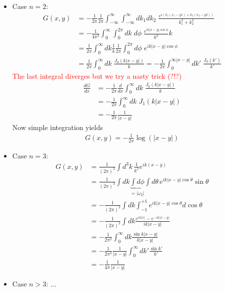 \documentclass[10pt,a4paper]{book}
\theoremstyle{definition}
\begin{document}
\begin{itemize}
\begin{center}
        \end{center}
        \item Case $n=2$:
        \begin{align}
            G(x,y)&=-\frac{1}{2\pi}\frac{1}{2\pi}\int_{-\infty}^\infty \int_{-\infty}^\infty dk_1 dk_2\; \frac{e^{i(k_1(x_1-y1)+k_2(x_2-y2))}}{k_1^2+k_2^2}\\
            &=-\frac{1}{4\pi^2}\int_{0}^\infty \int_{0}^{2\pi} dk\;d\phi\; \frac{e^{ik |x-y|\cos\phi}}{k^2}k\\
            &=\frac{1}{2\pi}\int_{0}^\infty dk \frac{1}{k}\frac{1}{2\pi}\int_{0}^{2\pi} d\phi\; e^{ik |x-y|\cos\phi}\\
            &=\frac{1}{2\pi}\int_{0}^\infty dk \; \frac{J_0(k|x-y|)}{k}=-\frac{1}{2\pi}\int_{0}^{\infty|x-y|} dk' \; \frac{J_0(k')}{k'}
        \end{align}
        \textcolor{red}{The last integral diverges but we try a nasty trick (?!?)}
        \begin{align}
            \frac{dG}{dx}&=-\frac{1}{2\pi}\frac{d}{dx}\int_{0}^{\infty} dk \; \frac{J_0(k|x-y|)}{k}\\
            &=-\frac{1}{2\pi}\int_{0}^{\infty} dk \; J_1(k|x-y|)\\
            &=-\frac{1}{2\pi}\frac{1}{|x-y|}
        \end{align}
        Now simple integration yields
        \begin{align}
            G(x,y)=-\frac{1}{2\pi}\log(|x-y|)
        \end{align}
        \item Case $n=3$:
        \begin{align}
            G(x,y)&=\frac{1}{(2\pi)^{3}}\int d^3k\,\frac{1}{k^2}e^{ik(x-y)}\\
            &=\frac{1}{(2\pi)^{3}}\int dk\underbrace{\int d\phi}_{=|\omega_2|} \int d\theta\,e^{ik|x-y|\cos\theta}\sin\theta\\
            &=-\frac{1}{(2\pi)^{2}}\int dk \int_{-1}^{+1} e^{ik|x-y|\cos\theta}d\cos\theta\\
            &=-\frac{1}{(2\pi)^{2}}\int dk \frac{e^{ik|x|}-e^{-ik|x-y|}}{ik|x-y|}\\
            &=-\frac{1}{2\pi^2}\int_0^\infty dk \frac{\sin k|x-y|}{k|x-y|}\\
            &=-\frac{1}{2\pi^2}\frac{1}{|x-y|}\int_0^\infty dk' \frac{\sin k'}{k'}\\
            &=-\frac{1}{4\pi}\frac{1}{|x-y|}
        \end{align}
        \item Case $n>3$:
        ...
        
    \end{itemize}
\end{document}
